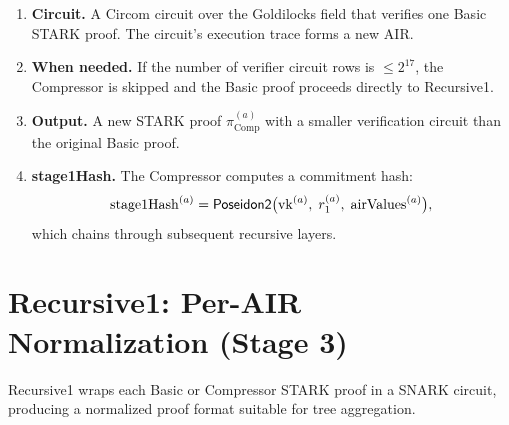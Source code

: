 \begin{enumerate}[label=(\roman*)]
  \item \textbf{Circuit.}
        A Circom circuit over the Goldilocks field that verifies one Basic STARK proof.
        The circuit's execution trace forms a new AIR.

  \item \textbf{When needed.}
        If the number of verifier circuit rows is $\leq 2^{17}$,
        the Compressor is skipped and the Basic proof proceeds directly
        to Recursive1.

  \item \textbf{Output.}
        A new STARK proof $\pi^{(a)}_{\mathrm{Comp}}$ with a smaller
        verification circuit than the original Basic proof.

  \item \textbf{stage1Hash.}
        The Compressor computes a commitment hash:
        \[
          \mathrm{stage1Hash}^{(a)} = \textsf{Poseidon2}\bigl(\mathrm{vk}^{(a)},\;
          r_1^{(a)},\; \mathrm{airValues}^{(a)}\bigr),
        \]
        which chains through subsequent recursive layers.
\end{enumerate}

\section{Recursive1: Per-AIR Normalization (Stage 3)}
\label{sec:recursive1}

Recursive1 wraps each Basic or Compressor STARK proof in a SNARK circuit,
producing a normalized proof format suitable for tree aggregation.

